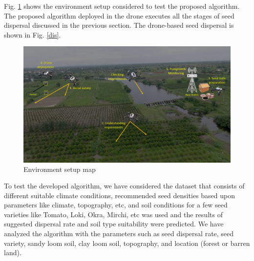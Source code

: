 \documentclass[conference]{IEEEtran}
\begin{document}
Fig. \ref{env} shows the environment setup considered to test the proposed algorithm. The proposed algorithm deployed in the drone executes all the stages of seed dispersal discussed in the previous section. The drone-based seed dispersal is shown in Fig. \ref{dis}.
\begin{figure}[htp]
    \centering
    \includegraphics[scale=0.25]{hornbill.png}
    \caption{Environment setup map}
    \label{env}
\end{figure}

To test the developed algorithm, we have considered the dataset that consists of different suitable climate conditions, recommended seed densities based upon parameters like climate, topography, etc, and soil conditions for a few seed varieties like Tomato, Loki, Okra, Mirchi, etc was used and the results of suggested dispersal rate and soil type suitability were predicted.
We have analyzed the algorithm with the parameters such as seed dispersal rate, seed variety, sandy loom soil, clay loom soil, topography, and location (forest or barren land). 
\end{document}
